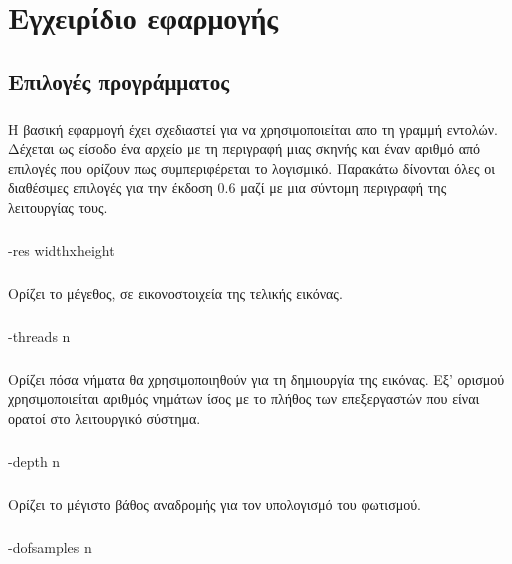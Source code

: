 \chapter{Εγχειρίδιο εφαρμογής}

\begin{sloppypar}

\section{Επιλογές προγράμματος}
\paragraph{}
	H βασική εφαρμογή έχει σχεδιαστεί για να χρησιμοποιείται απο τη γραμμή εντολών. Δέχεται ως είσοδο ένα αρχείο με
τη περιγραφή μιας σκηνής και έναν αριθμό από επιλογές που ορίζουν πως συμπεριφέρεται το λογισμικό. Παρακάτω δίνονται
όλες οι διαθέσιμες επιλογές για την έκδοση 0.6 μαζί με μια σύντομη περιγραφή της λειτουργίας τους.

\paragraph{}
	-res widthxheight
\paragraph{}
	Ορίζει το μέγεθος, σε εικονοστοιχεία της τελικής εικόνας.

\paragraph{}
	-threads n
\paragraph{}
	Ορίζει πόσα νήματα θα χρησιμοποιηθούν για τη δημιουργία της εικόνας. Εξ' ορισμού χρησιμοποιείται αριθμός νημάτων ίσος με
το πλήθος των επεξεργαστών που είναι ορατοί στο λειτουργικό σύστημα.

\paragraph{}
	-depth n
\paragraph{}
	Ορίζει το μέγιστο βάθος αναδρομής για τον υπολογισμό του φωτισμού.

\paragraph{}
	-dofsamples n

\end{sloppypar}

